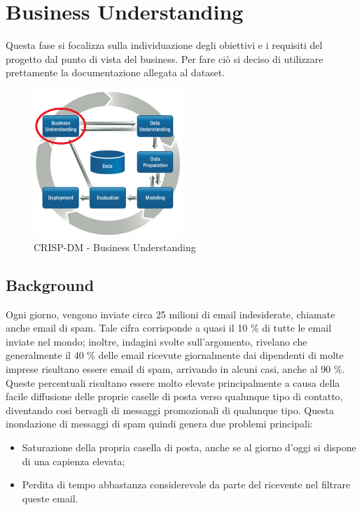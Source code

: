 \chapter{Business Understanding}
Questa fase si focalizza sulla individuazione degli obiettivi e i requisiti del progetto dal punto di vista del business. Per fare ciò si deciso di utilizzare prettamente la documentazione allegata al dataset.

\begin{figure}[hbtp]
	\centering
	\includegraphics[width=0.5\textwidth]{./images/CRISPDM_1.png}
	\caption{CRISP-DM - Business Understanding}
	\label{CRISPDM_1}
\end{figure}

\section{Background}\label{Background}
Ogni giorno, vengono inviate circa 25 milioni di email indesiderate, chiamate anche email di spam. Tale cifra corrisponde a quasi il 10 \% di tutte le email inviate nel mondo; inoltre, indagini svolte sull'argomento, rivelano che generalmente il 40 \% delle email ricevute giornalmente dai dipendenti di molte imprese risultano essere email di spam, arrivando in alcuni casi, anche al 90 \%.
Queste percentuali risultano essere molto elevate principalmente a causa della facile diffusione delle proprie caselle di posta verso qualunque tipo di contatto, diventando cosi bersagli di messaggi promozionali di qualunque tipo. Questa inondazione di messaggi di spam quindi genera due problemi principali:
\begin{itemize}
\item Saturazione della propria casella di posta, anche se al giorno d'oggi si dispone di una capienza elevata;
\item Perdita di tempo abbastanza considerevole da parte del ricevente nel filtrare queste email.
\end{itemize}

